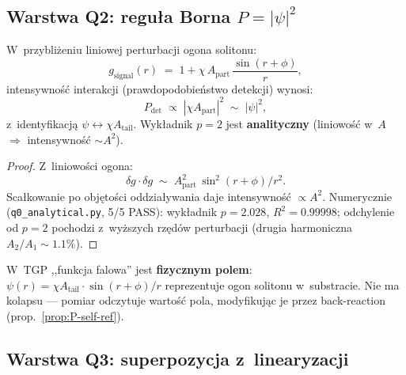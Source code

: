 \subsection{Warstwa Q2: reguła Borna $P = |\psi|^2$}%
\label{app:P-Q2}

\begin{theorem}%
\label{thm:P-born}
W~przybliżeniu liniowej perturbacji ogona solitonu:
\begin{equation}\label{eq:P-born-amplitude}
  g_{\mathrm{signal}}(r) \;=\; 1 + \chi\,A_{\mathrm{part}}\,
  \frac{\sin(r + \phi)}{r},
\end{equation}
intensywność interakcji (prawdopodobieństwo detekcji) wynosi:
\begin{equation}\label{eq:P-born-rule}
  P_{\mathrm{det}} \;\propto\; |\chi A_{\mathrm{part}}|^2
  \;\sim\; |\psi|^2,
\end{equation}
z~identyfikacją $\psi \leftrightarrow \chi A_{\mathrm{tail}}$.
Wykładnik $p = 2$ jest \textbf{analityczny} (liniowość w~$A$
$\Rightarrow$ intensywność $\sim A^2$).
\end{theorem}

\begin{proof}
Z~liniowości ogona:
\[
  \delta g \cdot \delta g \;\sim\; A_{\mathrm{part}}^2\,
  \sin^2(r+\phi)/r^2.
\]
Scałkowanie po objętości oddziaływania daje intensywność
$\propto A^2$. Numerycznie (\texttt{q0\_analytical.py}, 5/5 PASS):
wykładnik $p = 2.028$, $R^2 = 0.99998$; odchylenie od $p = 2$
pochodzi z~wyższych rzędów perturbacji (drugia harmoniczna
$A_2/A_1 \sim 1.1\%$).
\end{proof}

\begin{remark}
W~TGP ,,funkcja falowa'' jest \textbf{fizycznym polem}:
$\psi(r) = \chi A_{\mathrm{tail}} \cdot \sin(r+\phi)/r$
reprezentuje ogon solitonu w~substracie. Nie ma kolapsu ---
pomiar odczytuje wartość pola, modyfikując je przez back-reaction
(prop.~\ref{prop:P-self-ref}).
\end{remark}

\subsection{Warstwa Q3: superpozycja z~linearyzacji}%
\label{app:P-Q3}

